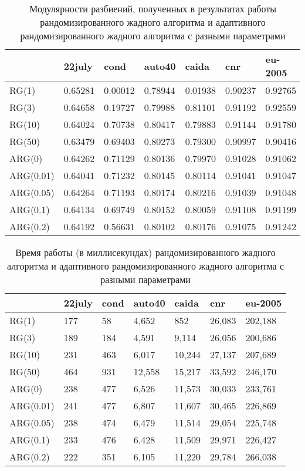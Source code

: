 \begin{table}[H]
	\caption{Модулярности разбиений, полученных в результатах работы рандомизированного жадного алгоритма и адаптивного рандомизированного жадного алгоритма с разными параметрами}
	\label{tab:arg-res-q}
	\begin{tabularx}{\textwidth}{XR{1.5cm}R{1.5cm}R{1.5cm}R{1.5cm}R{1.5cm}R{1.5cm}}\hline
				& 22july 	& cond 		& auto40	& caida 	& cnr 		& eu-2005	\\\hline
	RG(1) 		& 0.65281	& 0.00012 	& 0.78944	& 0.01938	& 0.90237 	& 0.92765	\\
	RG(3)		& 0.64658	& 0.19727	& 0.79988	& 0.81101	& 0.91192	& 0.92559	\\
	RG(10)		& 0.64024	& 0.70738	& 0.80417	& 0.79883	& 0.91144	& 0.91780	\\
	RG(50)		& 0.63479	& 0.69403	& 0.80273	& 0.79300	& 0.90997	& 0.90416	\\
	ARG(0)		& 0.64262	& 0.71129	& 0.80136	& 0.79970	& 0.91028	& 0.91062	\\
	ARG(0.01)	& 0.64041	& 0.71232	& 0.80145	& 0.80114	& 0.91041	& 0.91047	\\
	ARG(0.05)	& 0.64264	& 0.71193	& 0.80174	& 0.80216	& 0.91039	& 0.91048	\\
	ARG(0.1)	& 0.64134	& 0.69749	& 0.80152	& 0.80059	& 0.91108	& 0.91199	\\
	ARG(0.2)	& 0.64192	& 0.56631	& 0.80102	& 0.80176	& 0.91075	& 0.91242	\\\hline
	\end{tabularx}
\end{table}
\begin{table}[H]
	\caption{Время работы (в миллисекундах) рандомизированного жадного алгоритма и адаптивного рандомизированного жадного алгоритма с разными параметрами}
	\label{tab:arg-res-t}
	\begin{tabularx}{\textwidth}{XR{1.5cm}R{1.5cm}R{1.5cm}R{1.5cm}R{1.5cm}R{1.5cm}}\hline
				& 22july 	& cond 		& auto40	& caida 	& cnr 		& eu-2005	\\\hline
	RG(1) 		& 177		& 58 		& 4,652		& 852		& 26,083	& 202,188	\\
	RG(3)		& 189		& 184		& 4,591		& 9,114		& 26,056	& 200,686	\\
	RG(10)		& 231		& 463		& 6,017		& 10,244	& 27,137	& 207,689	\\
	RG(50)		& 464		& 931		& 12,558	& 15,217	& 33,592	& 246,170	\\
	ARG(0)		& 238		& 477		& 6,526		& 11,573	& 30,033	& 233,761	\\
	ARG(0.01)	& 241		& 477		& 6,807		& 11,607	& 30,465	& 226,869	\\
	ARG(0.05)	& 238		& 474		& 6,479		& 11,514	& 29,054	& 225,748	\\
	ARG(0.1)	& 233		& 476		& 6,428		& 11,509	& 29,971	& 226,427	\\
	ARG(0.2)	& 222		& 351		& 6,105		& 11,220	& 29,784	& 266,038	\\\hline
	\end{tabularx}
\end{table}

